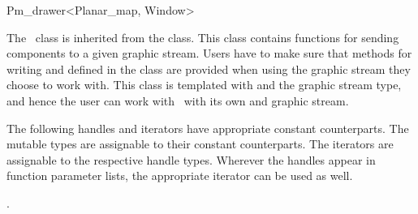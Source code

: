
\ccRefPageBegin


\renewcommand{\ccRefPageBegin}{\begin{ccAdvanced}}
\renewcommand{\ccRefPageEnd}{\end{ccAdvanced}}

\begin{ccRefClass}{Pm_drawer<Planar_map, Window>}


\ccDefinition
The \ccRefName\ class is inherited from the  class. 
This class contains functions for sending  components to a given graphic stream.
Users have to make sure that methods for writing  and  defined in  
the  class are provided when using the graphic stream they choose to work with.
This class is templated with  and the graphic stream type, and hence the user can work with \ccRefName\ with its own  and graphic stream. 
 

\ccTypes

The following handles and iterators have appropriate constant counterparts. The mutable types are assignable to their
constant counterparts. The iterators are assignable to the respective handle types. 
Wherever the handles appear in function parameter lists, the appropriate iterator can be used as well. 

.


\end{ccRefClass}
